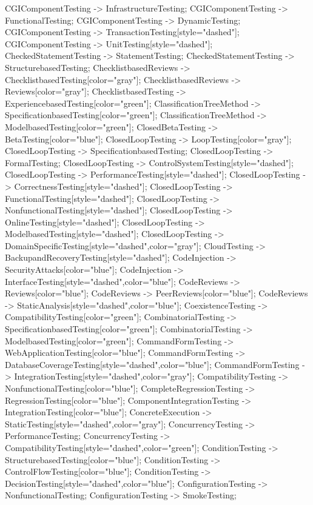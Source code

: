 \documentclass{article}
\begin{document}
{CGIComponentTesting -> InfrastructureTesting;
CGIComponentTesting -> FunctionalTesting;
CGIComponentTesting -> DynamicTesting;
CGIComponentTesting -> TransactionTesting[style="dashed"];
CGIComponentTesting -> UnitTesting[style="dashed"];
CheckedStatementTesting -> StatementTesting;
CheckedStatementTesting -> StructurebasedTesting;
ChecklistbasedReviews -> ChecklistbasedTesting[color="gray"];
ChecklistbasedReviews -> Reviews[color="gray"];
ChecklistbasedTesting -> ExperiencebasedTesting[color="green"];
ClassificationTreeMethod -> SpecificationbasedTesting[color="green"];
ClassificationTreeMethod -> ModelbasedTesting[color="green"];
ClosedBetaTesting -> BetaTesting[color="blue"];
ClosedLoopTesting -> LoopTesting[color="gray"];
ClosedLoopTesting -> SpecificationbasedTesting;
ClosedLoopTesting -> FormalTesting;
ClosedLoopTesting -> ControlSystemTesting[style="dashed"];
ClosedLoopTesting -> PerformanceTesting[style="dashed"];
ClosedLoopTesting -> CorrectnessTesting[style="dashed"];
ClosedLoopTesting -> FunctionalTesting[style="dashed"];
ClosedLoopTesting -> NonfunctionalTesting[style="dashed"];
ClosedLoopTesting -> OnlineTesting[style="dashed"];
ClosedLoopTesting -> ModelbasedTesting[style="dashed"];
ClosedLoopTesting -> DomainSpecificTesting[style="dashed",color="gray"];
CloudTesting -> BackupandRecoveryTesting[style="dashed"];
CodeInjection -> SecurityAttacks[color="blue"];
CodeInjection -> InterfaceTesting[style="dashed",color="blue"];
CodeReviews -> Reviews[color="blue"];
CodeReviews -> PeerReviews[color="blue"];
CodeReviews -> StaticAnalysis[style="dashed",color="blue"];
CoexistenceTesting -> CompatibilityTesting[color="green"];
CombinatorialTesting -> SpecificationbasedTesting[color="green"];
CombinatorialTesting -> ModelbasedTesting[color="green"];
CommandFormTesting -> WebApplicationTesting[color="blue"];
CommandFormTesting -> DatabaseCoverageTesting[style="dashed",color="blue"];
CommandFormTesting -> IntegrationTesting[style="dashed",color="gray"];
CompatibilityTesting -> NonfunctionalTesting[color="blue"];
CompleteRegressionTesting -> RegressionTesting[color="blue"];
ComponentIntegrationTesting -> IntegrationTesting[color="blue"];
ConcreteExecution -> StaticTesting[style="dashed",color="gray"];
ConcurrencyTesting -> PerformanceTesting;
ConcurrencyTesting -> CompatibilityTesting[style="dashed",color="green"];
ConditionTesting -> StructurebasedTesting[color="blue"];
ConditionTesting -> ControlFlowTesting[color="blue"];
ConditionTesting -> DecisionTesting[style="dashed",color="blue"];
ConfigurationTesting -> NonfunctionalTesting;
ConfigurationTesting -> SmokeTesting;
}
\end{document}
